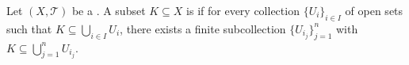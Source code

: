 \begin{definition}[Compactness]  \label{definition:compact_subset_of_a_topological_space_alternate_definition}
Let $(X, \mathcal{T})$ be a . A subset $K \subseteq X$ is  if for every collection $\{ U_i \}_{i \in I}$ of open sets such that $K \subseteq \bigcup_{i \in I} U_i$, there exists a finite subcollection $\{ U_{i_j} \}_{j=1}^n$ with $K \subseteq \bigcup_{j=1}^n U_{i_j}$.
\end{definition}